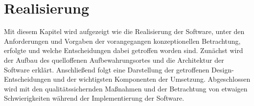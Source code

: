 \chapter{Realisierung}\label{ch:realisierung}

Mit diesem Kapitel wird aufgezeigt wie die Realisierung der Software, unter den Anforderungen und Vorgaben der vorangegangen konzeptionellen Betrachtung, erfolgte und welche Entscheidungen dabei getroffen worden sind.
Zunächst wird der Aufbau des quelloffenen Aufbewahrungsortes und die Architektur der Software erklärt.
Anschließend folgt eine Darstellung der getroffenen Design-Entscheidungen und der wichtigsten Komponenten der Umsetzung.
Abgeschlossen wird mit den qualitätssichernden Maßnahmen und der Betrachtung von etwaigen Schwierigkeiten während der Implementierung der Software.
